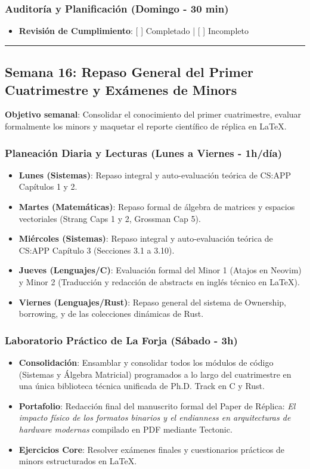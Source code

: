 \documentclass[11pt, a4paper]{article}
\begin{document}
\subsubsection{Auditoría y Planificación (Domingo - 30 min)}
\begin{itemize}
    \item \textbf{Revisión de Cumplimiento}: [ ] Completado | [ ] Incompleto
\end{itemize}

\noindent\rule{\textwidth}{0.4pt}

\subsection{Semana 16: Repaso General del Primer Cuatrimestre y Exámenes de Minors}
\textbf{Objetivo semanal}: Consolidar el conocimiento del primer cuatrimestre, evaluar formalmente los minors y maquetar el reporte científico de réplica en LaTeX.

\subsubsection{Planeación Diaria y Lecturas (Lunes a Viernes - 1h/día)}
\begin{itemize}
    \item \textbf{Lunes (Sistemas)}: Repaso integral y auto-evaluación teórica de CS:APP Capítulos 1 y 2.
    \item \textbf{Martes (Matemáticas)}: Repaso formal de álgebra de matrices y espacios vectoriales (Strang Caps 1 y 2, Grossman Cap 5).
    \item \textbf{Miércoles (Sistemas)}: Repaso integral y auto-evaluación teórica de CS:APP Capítulo 3 (Secciones 3.1 a 3.10).
    \item \textbf{Jueves (Lenguajes/C)}: Evaluación formal del Minor 1 (Atajos en Neovim) y Minor 2 (Traducción y redacción de abstracts en inglés técnico en LaTeX).
    \item \textbf{Viernes (Lenguajes/Rust)}: Repaso general del sistema de Ownership, borrowing, y de las colecciones dinámicas de Rust.
\end{itemize}

\subsubsection{Laboratorio Práctico de La Forja (Sábado - 3h)}
\begin{itemize}
    \item \textbf{Consolidación}: Ensamblar y consolidar todos los módulos de código (Sistemas y Álgebra Matricial) programados a lo largo del cuatrimestre en una única biblioteca técnica unificada de Ph.D. Track en C y Rust.
    \item \textbf{Portafolio}: Redacción final del manuscrito formal del Paper de Réplica: \textit{El impacto físico de los formatos binarios y el endianness en arquitecturas de hardware modernas} compilado en PDF mediante Tectonic.
    \item \textbf{Ejercicios Core}: Resolver exámenes finales y cuestionarios prácticos de minors estructurados en LaTeX.
\end{itemize}
\end{document}
